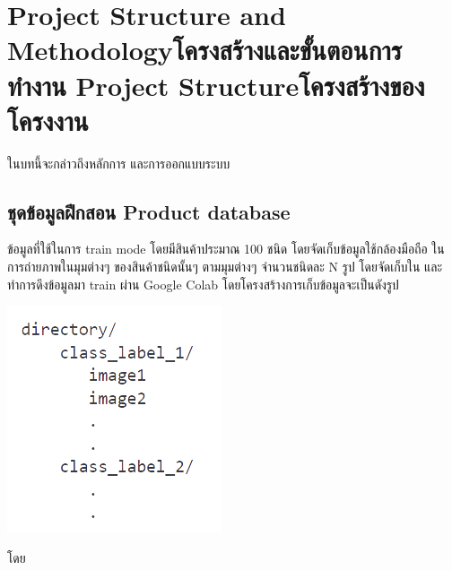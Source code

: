 \chapter{\ifproject%
\ifenglish Project Structure and Methodology\else โครงสร้างและขั้นตอนการทำงาน\fi
\else%
\ifenglish Project Structure\else โครงสร้างของโครงงาน\fi
\fi
}

ในบทนี้จะกล่าวถึงหลักการ และการออกแบบระบบ

\makeatletter


\makeatother

\section{ชุดข้อมูลฝึกสอน Product database}
ข้อมูลที่ใช้ในการ train mode โดยมีสินค้าประมาณ 100 ชนิด โดยจัดเก็บข้อมูลใช้กล้องมือถือ ในการถ่ายภาพในมุมต่างๆ
ของสินค้าชนิดนั้นๆ ตามมุมต่างๆ จำนวนชนิดละ N รูป โดยจัดเก็บใน  และทำการดึงข้อมูลมา train ผ่าน Google Colab
 โดยโครงสร้างการเก็บข้อมูลจะเป็นดังรูป


 
\begin{center}
  \includegraphics[scale=0.45]{pic/st.png}
\end{center}
  โดย
 
